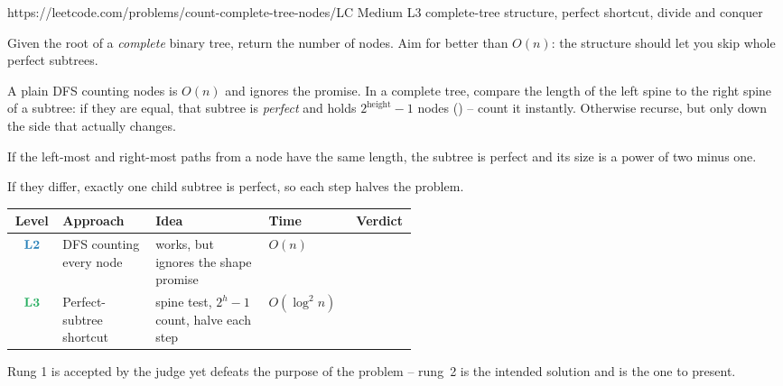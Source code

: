   {https://leetcode.com/problems/count-complete-tree-nodes/}{LC Medium L3}
  {complete-tree structure, perfect shortcut, divide and conquer}

\begin{problemstatement}
Given the root of a \emph{complete} binary tree, return the number of nodes. Aim for
better than $O(n)$: the structure should let you skip whole perfect subtrees.
\end{problemstatement}

A plain DFS counting nodes is $O(n)$ and ignores the promise. In a complete tree, compare
the length of the left spine to the right spine of a subtree: if they are equal, that
subtree is \emph{perfect} and holds $2^{\text{height}}-1$ nodes
() -- count it instantly. Otherwise recurse, but only down the
side that actually changes.

\begin{observation}
If the left-most and right-most paths from a node have the same length, the subtree is
perfect and its size is a power of two minus one.
\end{observation}
\begin{observation}
If they differ, exactly one child subtree is perfect, so each step halves the problem.
\end{observation}

\begin{thinkbox}
\end{thinkbox}

\begin{center}
\renewcommand{\arraystretch}{1.3}
\begin{tabular}{@{}c p{0.235\linewidth} p{0.28\linewidth} l c@{}}
\toprule
\textbf{Level} & \textbf{Approach} & \textbf{Idea} & \textbf{Time} & \textbf{Verdict} \\
\midrule
$\lv2$ & DFS counting every node & works, but ignores the shape promise & $O(n)$ & \ac \\
$\lv3$ & Perfect-subtree shortcut & spine test, $2^h-1$ count, halve each step & $O(\log^2 n)$ & \ac \\
\bottomrule
\end{tabular}
\end{center}
Rung 1 is accepted by the judge yet defeats the purpose of the problem -- rung~2 is the
intended solution and is the one to present.

